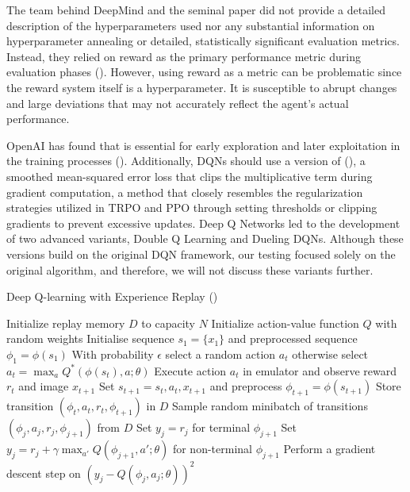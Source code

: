 \noindent The team behind DeepMind and the seminal paper did not provide a detailed description of the hyperparameters used nor any substantial information on hyperparameter annealing or detailed, statistically significant evaluation metrics. Instead, they relied on reward as the primary performance metric during evaluation phases (\textcolor{deepblue}{\cite{mnih2013playing}}). However, using reward as a metric can be problematic since the reward system itself is a hyperparameter. It is susceptible to abrupt changes and large deviations that may not accurately reflect the agent's actual performance. 

\bigskip

\noindent OpenAI has found that  is essential for early exploration and later exploitation in the training processes (\textcolor{deepblue}{\cite{baselines}}). Additionally, DQNs should use a version of  (\textcolor{deepblue}{\cite{wiki:Huber_loss}}), a smoothed mean-squared error loss that clips the multiplicative term during gradient computation, a method that closely resembles the regularization strategies utilized in TRPO and PPO through setting thresholds or clipping gradients to prevent excessive updates. Deep Q Networks led to the development of two advanced variants, Double Q Learning and Dueling DQNs. Although these versions build on the original DQN framework, our testing focused solely on the original algorithm, and therefore, we will not discuss these variants further.


\begin{algorithm}[htbp]
\caption{Deep Q-learning with Experience Replay (\cite{mnih2013playing})}
\begin{algorithmic}[1]
\State Initialize replay memory $D$ to capacity $N$
\State Initialize action-value function $Q$ with random weights
    \State Initialise sequence $s_1 = \{x_1\}$ and preprocessed sequence $\phi_1 = \phi(s_1)$
        \State With probability $\epsilon$ select a random action $a_t$
        \State otherwise select $a_t = \max_a Q^*(\phi(s_t), a; \theta)$
        \State Execute action $a_t$ in emulator and observe reward $r_t$ and image $x_{t+1}$
        \State Set $s_{t+1} = s_t, a_t, x_{t+1}$ and preprocess $\phi_{t+1} = \phi(s_{t+1})$
        \State Store transition $(\phi_t, a_t, r_t, \phi_{t+1})$ in $D$
        \State Sample random minibatch of transitions $(\phi_j , a_j , r_j , \phi_{j+1})$ from $D$
        \State Set $y_j = r_j$ for terminal $\phi_{j+1}$
        \State Set $y_j = r_j + \gamma \max_{a'} Q(\phi_{j+1}, a'; \theta)$ for non-terminal $\phi_{j+1}$
        \State Perform a gradient descent step on $(y_j - Q(\phi_j , a_j ; \theta))^2$
    \EndFor
\EndFor
\end{algorithmic}
\end{algorithm}

